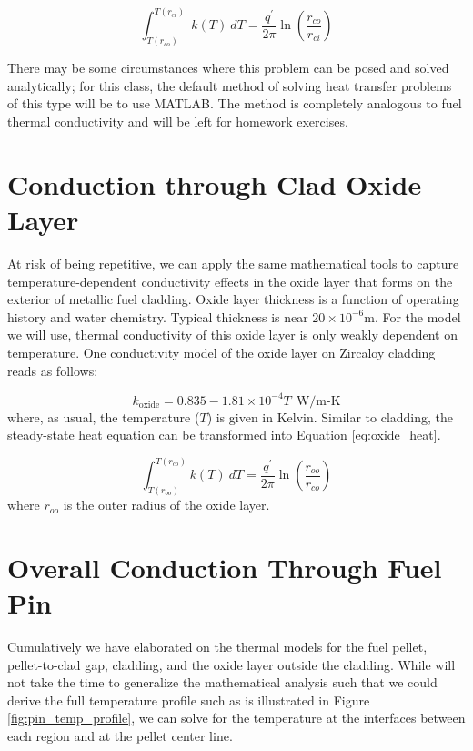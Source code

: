 \begin{equation}
\int_{T(r_{co})}^{T(r_{ci})} \ k(T) \ dT = \frac{q^{\prime}}{2 \pi} \ln{\left(\frac{r_{co}}{r_{ci}} \right)}
\label{eq:clad_heat}
\end{equation}

There may be some circumstances where this problem can be posed and solved analytically; for this class, the default method of solving heat transfer problems of this type will be to use MATLAB.  The method is completely analogous to fuel thermal conductivity and will be left for homework exercises.

\section{Conduction through Clad Oxide Layer}
At risk of being repetitive, we can apply the same mathematical tools to capture temperature-dependent conductivity effects in the oxide layer that forms on the exterior of metallic fuel cladding.  
Oxide layer thickness is a function of operating history and water chemistry.  Typical thickness is near $20\times 10^{-6}$m.  For the model we will use, thermal conductivity of this oxide layer is only weakly dependent on temperature.  One conductivity model of the oxide layer on Zircaloy cladding reads as follows:

\begin{equation}
k_{\text{oxide}}=0.835 - 1.81 \times 10^{-4}T \ \  \text{W/m-K}
\label{eq:cond_oxide}
\end{equation}
where, as usual, the temperature ($T$) is given in Kelvin. Similar to cladding, the steady-state heat equation can be transformed into Equation \ref{eq:oxide_heat}.

\begin{equation}
\int_{T(r_{oo})}^{T(r_{co})} k(T) \ dT = \frac{q^{\prime}}{2 \pi}\ln{\left(\frac{r_{oo}}{r_{co}} \right)}
\label{eq:oxide_heat}
\end{equation}
where $r_{oo}$ is the outer radius of the oxide layer.

\section{Overall Conduction Through Fuel Pin}

Cumulatively we have elaborated on the thermal models for the fuel pellet, pellet-to-clad gap, cladding, and the oxide layer outside the cladding.  While will not take the time to generalize the mathematical analysis such that we could derive the full temperature profile such as is illustrated in Figure \ref{fig:pin_temp_profile}, we can solve for the temperature at the interfaces between each region and at the pellet center line.

